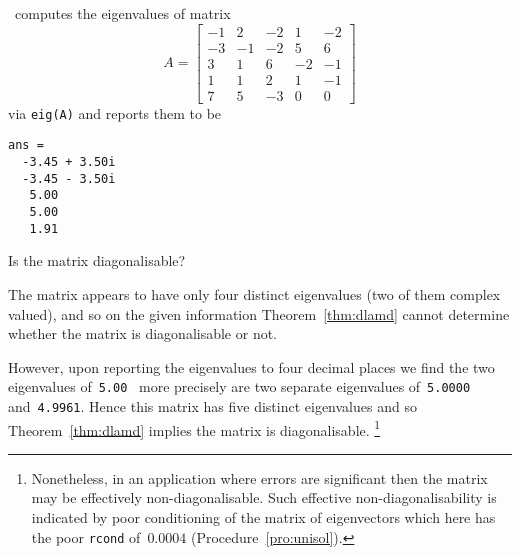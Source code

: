 \begin{example} \label{eg:}
\script\ computes the eigenvalues of matrix
\begin{equation*}
A=\begin{bmatrix}-1&2&-2&1&-2
\\-3&-1&-2&5&6
\\3&1&6&-2&-1
\\1&1&2&1&-1
\\7&5&-3&0&0 \end{bmatrix}
\end{equation*}
via \verb|eig(A)| and reports them to be \twodp
\begin{verbatim}
ans =
  -3.45 + 3.50i
  -3.45 - 3.50i
   5.00
   5.00
   1.91
\end{verbatim}
Is the matrix diagonalisable?
\begin{solution} 
The matrix appears to have only four distinct eigenvalues (two of them complex valued), and so on the given information Theorem~\ref{thm:dlamd} cannot determine whether the matrix is diagonalisable or not.

However, upon reporting the eigenvalues to four decimal places we find the two eigenvalues of~\verb|5.00| \twodp\ more precisely are two separate eigenvalues of~\verb|5.0000| and~\verb|4.9961|.
Hence this matrix has five distinct eigenvalues and so Theorem~\ref{thm:dlamd} implies the matrix is diagonalisable.
\footnote{Nonetheless, in an application where errors are significant then the matrix may be effectively non-diagonalisable.
Such effective non-diagonalisability is indicated by poor conditioning of the matrix of eigenvectors which here has the poor \texttt{rcond} of~\(0.0004\) (Procedure~\ref{pro:unisol}).}
\end{solution}
\end{example}










